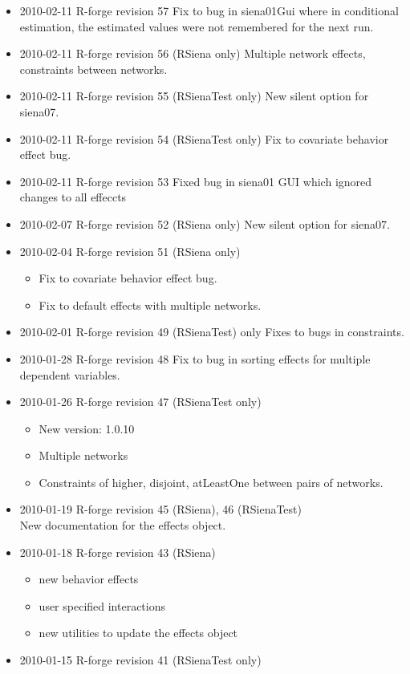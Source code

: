 \documentclass[a4paper,fleqn,11pt]{article}
\newcommand{\+}{\, + \,}
\begin{document}
\begin{small}
\begin{itemize}
\item 2010-02-11 R-forge revision 57 Fix to bug in siena01Gui where in
  conditional estimation, the
  estimated values were not remembered for the next run.
\item 2010-02-11 R-forge revision 56 (RSiena only)
Multiple network effects, constraints between networks.
\item 2010-02-11 R-forge revision 55 (RSienaTest only)
New silent option for siena07.
\item 2010-02-11 R-forge revision 54 (RSienaTest only)
Fix to covariate behavior effect bug.
\item 2010-02-11 R-forge revision 53
Fixed bug in siena01 GUI which ignored changes to all effeccts
\item 2010-02-07 R-forge revision 52 (RSiena only)
New silent option for siena07.
\item 2010-02-04 R-forge revision 51 (RSiena only)
\begin{itemize}
\item
Fix to covariate behavior effect bug.
\item
Fix to default effects with multiple networks.
\end{itemize}
\item 2010-02-01 R-forge revision 49 (RSienaTest) only
Fixes to bugs in constraints.
\item 2010-01-28 R-forge revision 48
Fix to bug in sorting effects for multiple dependent variables.
\item 2010-01-26 R-forge revision 47 (RSienaTest only)
\begin{itemize}
\item New version: 1.0.10
\item Multiple networks
\item Constraints of higher, disjoint, atLeastOne between pairs of networks.
\end{itemize}
\item 2010-01-19 R-forge revision 45 (RSiena), 46 (RSienaTest)\\
 New documentation for the effects object.
\item 2010-01-18 R-forge revision 43 (RSiena)
\begin{itemize}
\item new behavior effects
\item user specified interactions
\item new utilities to update the effects object
\end{itemize}
\item 2010-01-15 R-forge revision 41 (RSienaTest only)


\end{itemize}
\end{small}
\end{document}
